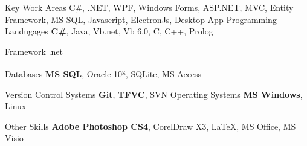 

\begin{cvskills}
\cvskill
{Key Work Areas} %
{C\#, .NET, WPF, Windows Forms, ASP.NET, MVC, Entity Framework, MS SQL, Javascript, ElectronJs, Desktop App} %
  \cvskill
    {Programming Landugages} %
    {\textbf{C\#}, Java, Vb.net, Vb 6.0, C, C++, Prolog} %
    
 \cvskill
{Framework} %
{.net} %
  
  \cvskill
    {Databases} %
    {\textbf{MS SQL}, Oracle 10\textsuperscript{g}, SQLite, MS Access} %
    
   \cvskill
 {Version Control Systems} %
 {\textbf{Git}, \textbf{TFVC}, SVN } %
 \cvskill
 {Operating Systems} %
 {\textbf{MS Windows}, Linux} %
 
\cvskill
{Other Skills} %
{\textbf{Adobe Photoshop CS4}, CorelDraw X3, \LaTeX, MS Office, MS Visio} %

\end{cvskills}
